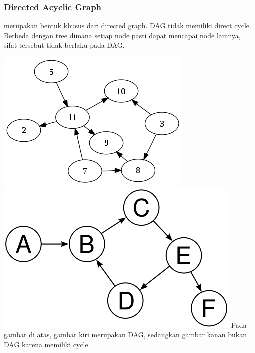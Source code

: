 \begin{frame}
\frametitle{Directed Acyclic Graph}
 merupakan bentuk khusus dari directed graph. DAG tidak memiliki direct cycle. Berbeda dengan tree dimana setiap node pasti dapat mencapai node lainnya, sifat tersebut tidak berlaku pada DAG.

\includegraphics[width=4 cm]{asset/dag.png}
\hspace{\fill}
\includegraphics[width=4 cm]{asset/not-dag.png}
\newline\newline
Pada gambar di atas, gambar kiri merupakan DAG, sedangkan gambar kanan bukan DAG karena memiliki cycle
\end{frame}

